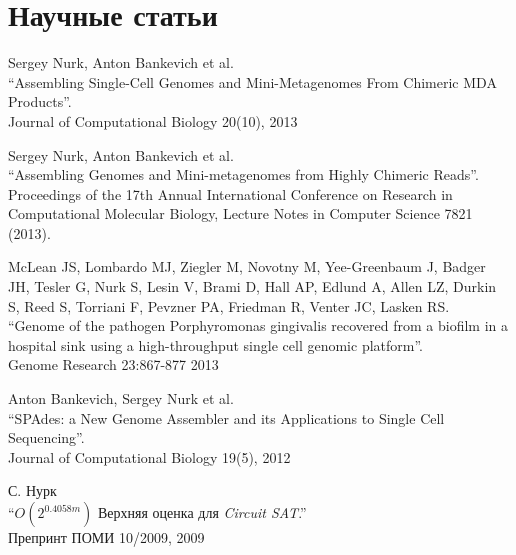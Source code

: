 \section{Научные статьи}
%
\begin{innerlist}
\item Sergey Nurk, Anton Bankevich et al.\\
``Assembling Single-Cell Genomes and Mini-Metagenomes From Chimeric MDA Products''.\\
Journal of Computational Biology 20(10), 2013

\blankline

\item Sergey Nurk, Anton Bankevich et al.\\
``Assembling Genomes and Mini-metagenomes from Highly Chimeric Reads''. \\
Proceedings of the 17th Annual International Conference on Research in Computational Molecular Biology, Lecture Notes in Computer Science 7821 (2013).

\blankline

\item McLean JS, Lombardo MJ, Ziegler M, Novotny M, Yee-Greenbaum J, Badger JH, Tesler G, Nurk S, Lesin V, Brami D, Hall AP, Edlund A, Allen LZ, Durkin S, Reed S, Torriani F, Pevzner PA, Friedman R, Venter JC, Lasken RS. \\
``Genome of the pathogen Porphyromonas gingivalis recovered from a biofilm in a hospital sink using a high-throughput single cell genomic platform''.\\
Genome Research 23:867-877 2013

\blankline

\item Anton Bankevich, Sergey Nurk et al.\\
``SPAdes: a New Genome Assembler and its Applications to Single Cell Sequencing''.\\
Journal of Computational Biology 19(5), 2012

\blankline

\item С. Нурк\\
``$O(2^{0.4058m})$ Верхняя оценка для \textit{Circuit SAT}.''\\
Препринт ПОМИ 10/2009, 2009
\end{innerlist}

